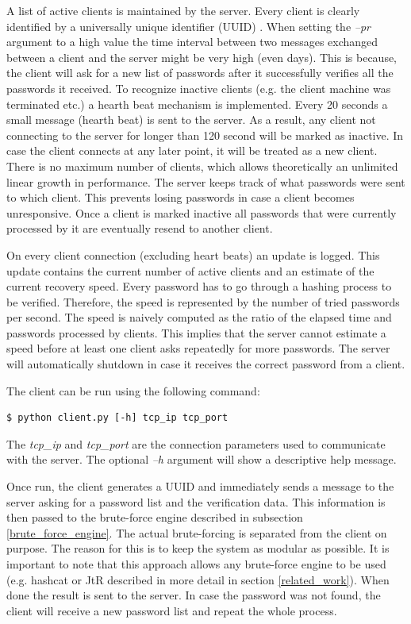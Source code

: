 \documentclass[11pt,oneside]{fithesis2}
\begin{document}
A list of active clients is maintained by the server. Every client is clearly identified by a universally unique identifier (UUID) \cite{rfc4122}. When setting the \textit{–pr} argument to a high value the time interval between two messages exchanged between a client and the server might be very high (even days). This is because, the client will ask for a new list of passwords after it successfully verifies all the passwords it received. To recognize inactive clients (e.g. the client machine was terminated etc.) a hearth beat mechanism is implemented. Every 20 seconds a small message (hearth beat) is sent to the server. As a result, any client not connecting to the server for longer than 120 second will be marked as inactive. In case the client connects at any later point, it will be treated as a new client. There is no maximum number of clients, which allows theoretically an unlimited linear growth in performance. The server keeps track of what passwords were sent to which client. This prevents losing passwords in case a client becomes unresponsive. Once a client is marked inactive all passwords that were currently processed by it are eventually resend to another client. 

On every client connection (excluding heart beats) an update is logged. This update contains the current number of active clients and an estimate of the current recovery speed. Every password has to go through a hashing process to be verified. Therefore, the speed is represented by the number of tried passwords per second. The speed is naively computed as the ratio of the elapsed time and passwords processed by clients. This implies that the server cannot estimate a speed before at least one client asks repeatedly for more passwords. The server will automatically shutdown in case it receives the correct password from a client.

The client can be run using the following command:
\begin{lstlisting}
$ python client.py [-h] tcp_ip tcp_port 
\end{lstlisting}

The \textit{tcp\_ip} and \textit{tcp\_port} are the connection parameters used to communicate with the server. The optional \textit{–h} argument will show a descriptive help message. 

Once run, the client generates a UUID and immediately sends a message to the server asking for a password list and the verification data. This information is then passed to the brute-force engine described in subsection \ref{brute_force_engine}. The actual brute-forcing is separated from the client on purpose. The reason for this is to keep the system as modular as possible. It is important to note that this approach allows any brute-force engine to be used (e.g. hashcat or JtR \cite{hashcat, jtr} described in more detail in section \ref{related_work}). When done the result is sent to the server. In case the password was not found, the client will receive a new password list and repeat the whole process.
\end{document}
